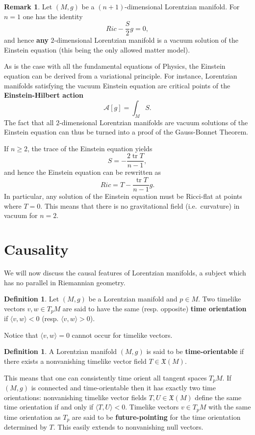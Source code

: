 \documentclass[10pt]{amsart}
\newcommand{\tr}{\operatorname{tr}}
\newcommand{\cX}{\mathfrak{X}}
\theoremstyle{definition}
\newtheorem{Def}[Thm]{Definition}
\newtheorem{Remark}[Thm]{Remark}
\theoremstyle{remark}
\begin{document}
\begin{Remark}
Let $(M,g)$ be a $(n+1)$-dimensional Lorentzian manifold. For $n=1$ one has the identity
\[
Ric - \frac{S}2 g = 0,
\]
and hence {\bf any} $2$-dimensional Lorentzian manifold is a vacuum solution of the Einstein equation (this being the only allowed matter model).

As is the case with all the fundamental equations of Physics, the Einstein equation can be derived from a variational principle. For instance, Lorentzian manifolds satisfying the vacuum Einstein equation are critical points of the {\bf Einstein-Hilbert action}
\[
\mathcal{A}[g] = \int_M S.
\]
The fact that all $2$-dimensional Lorentzian manifolds are vacuum solutions of the Einstein equation can thus be turned into a proof of the Gauss-Bonnet Theorem.

If $n \geq 2$, the trace of the Einstein equation  yields
\[
S = - \frac{2 \tr T}{n-1},
\]
and hence the Einstein equation can be rewritten as
\[
Ric = T - \frac{\tr T}{n-1} g.
\]
In particular, any solution of the Einstein equation must be Ricci-flat at points where $T=0$. This means that there is no gravitational field (i.e.~curvature) in vacuum for $n=2$.
\end{Remark}
%
%
\section{Causality}
%
We will now discuss the causal features of Lorentzian manifolds, a subject which has no parallel in Riemannian geometry. 

\begin{Def}
Let $(M,g)$ be a Lorentzian manifold and $p \in M$. Two timelike vectors $v,w \in T_pM$ are said to have the same (resp. opposite) {\bf time orientation} if $\langle v, w \rangle < 0$ (resp. $\langle v, w \rangle > 0$).
\end{Def}

Notice that $\langle v, w \rangle = 0$ cannot occur for timelike vectors.

\begin{Def}
A Lorentzian manifold $(M,g)$ is said to be {\bf time-orientable} if there exists a nonvanishing timelike vector field $T\in\cX(M)$.
\end{Def}

This means that one can consistently time orient all tangent spaces $T_pM$. If $(M,g)$ is connected and time-orientable then it has exactly two time orientations: nonvanishing timelike vector fields $T,U \in\cX(M)$ define the same time orientation if and only if $\langle T, U \rangle < 0$. Timelike vectors $v \in T_pM$ with the same time orientation as $T_p$ are said to be {\bf future-pointing} for the time orientation determined by $T$. This easily extends to nonvanishing null vectors.
\end{document}
